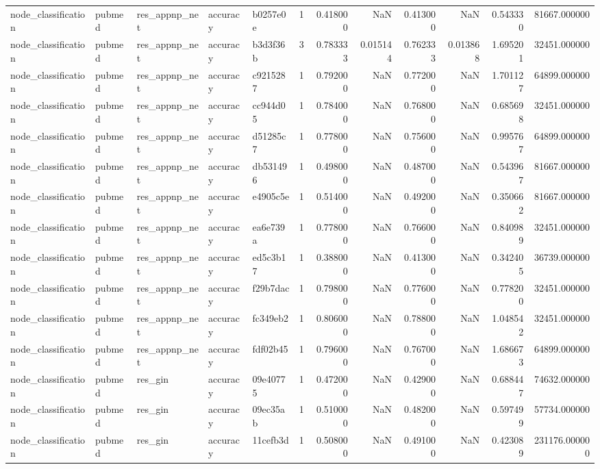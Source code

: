 \begin{tabular}{lllllrrrrrrr}
node_classification & pubmed & res_appnp_net & accuracy & b0257e0e & 1 & 0.418000 & NaN & 0.413000 & NaN & 0.543330 & 81667.000000 \\
node_classification & pubmed & res_appnp_net & accuracy & b3d3f36b & 3 & 0.783333 & 0.015144 & 0.762333 & 0.013868 & 1.695201 & 32451.000000 \\
node_classification & pubmed & res_appnp_net & accuracy & c9215287 & 1 & 0.792000 & NaN & 0.772000 & NaN & 1.701127 & 64899.000000 \\
node_classification & pubmed & res_appnp_net & accuracy & cc944d05 & 1 & 0.784000 & NaN & 0.768000 & NaN & 0.685698 & 32451.000000 \\
node_classification & pubmed & res_appnp_net & accuracy & d51285c7 & 1 & 0.778000 & NaN & 0.756000 & NaN & 0.995767 & 64899.000000 \\
node_classification & pubmed & res_appnp_net & accuracy & db531496 & 1 & 0.498000 & NaN & 0.487000 & NaN & 0.543967 & 81667.000000 \\
node_classification & pubmed & res_appnp_net & accuracy & e4905c5e & 1 & 0.514000 & NaN & 0.492000 & NaN & 0.350662 & 81667.000000 \\
node_classification & pubmed & res_appnp_net & accuracy & ea6e739a & 1 & 0.778000 & NaN & 0.766000 & NaN & 0.840989 & 32451.000000 \\
node_classification & pubmed & res_appnp_net & accuracy & ed5c3b17 & 1 & 0.388000 & NaN & 0.413000 & NaN & 0.342405 & 36739.000000 \\
node_classification & pubmed & res_appnp_net & accuracy & f29b7dac & 1 & 0.798000 & NaN & 0.776000 & NaN & 0.778200 & 32451.000000 \\
node_classification & pubmed & res_appnp_net & accuracy & fc349eb2 & 1 & 0.806000 & NaN & 0.788000 & NaN & 1.048542 & 32451.000000 \\
node_classification & pubmed & res_appnp_net & accuracy & fdf02b45 & 1 & 0.796000 & NaN & 0.767000 & NaN & 1.686673 & 64899.000000 \\
node_classification & pubmed & res_gin & accuracy & 09e40775 & 1 & 0.472000 & NaN & 0.429000 & NaN & 0.688447 & 74632.000000 \\
node_classification & pubmed & res_gin & accuracy & 09ec35ab & 1 & 0.510000 & NaN & 0.482000 & NaN & 0.597499 & 57734.000000 \\
node_classification & pubmed & res_gin & accuracy & 11cefb3d & 1 & 0.508000 & NaN & 0.491000 & NaN & 0.423089 & 231176.000000 \\

\end{tabular}
